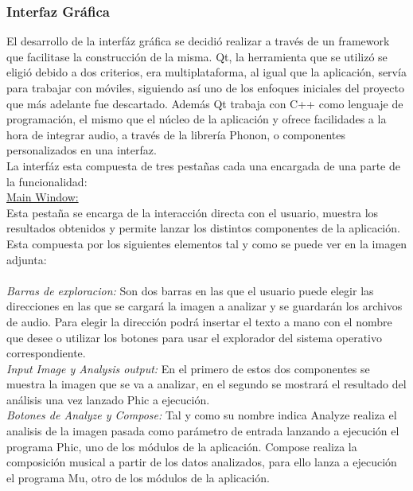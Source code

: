 \subsubsection{Interfaz Gráfica}

El desarrollo de la interfáz gráfica se decidió realizar a través de un framework que facilitase la construcción de la misma. Qt, la herramienta que se utilizó se eligió debido a dos criterios, era multiplataforma, al igual que la aplicación, servía para trabajar con móviles, siguiendo así uno de los enfoques iniciales del proyecto que más adelante fue descartado. Además Qt trabaja con C++ como lenguaje de programación, el mismo que el núcleo de la aplicación y ofrece facilidades a la hora de integrar audio, a través de la librería Phonon, o componentes personalizados en una interfaz.\\
\newline
La interfáz esta compuesta de tres pestañas cada una encargada de una parte de la funcionalidad:
\newline
\\\underline{Main Window:}
\\Esta pestaña se encarga de la interacción directa con el usuario, muestra los resultados obtenidos y permite lanzar los distintos componentes de la aplicación. 
\\Esta compuesta por los siguientes elementos tal y como se puede ver en la imagen adjunta:
\\
\newline
\\\textit{Barras de exploracion:} Son dos barras en las que el usuario puede elegir las direcciones en las que se cargará la imagen a analizar y se guardarán los archivos de audio. Para elegir la dirección podrá insertar el texto a mano con el nombre que desee o utilizar los botones para usar el explorador del sistema operativo correspondiente.
\\\textit{Input Image y Analysis output:} En el primero de estos dos componentes se muestra la imagen que se va a analizar, en el segundo se mostrará el resultado del análisis una vez lanzado Phic a ejecución.
\\\textit{Botones de Analyze y Compose:} Tal y como su nombre indica Analyze realiza el analisis de la imagen pasada como parámetro de entrada lanzando a ejecución el programa Phic, uno de los módulos de la aplicación. Compose realiza la composición musical a partir de los datos analizados, para ello lanza a ejecución el programa Mu, otro de los módulos de la aplicación.
